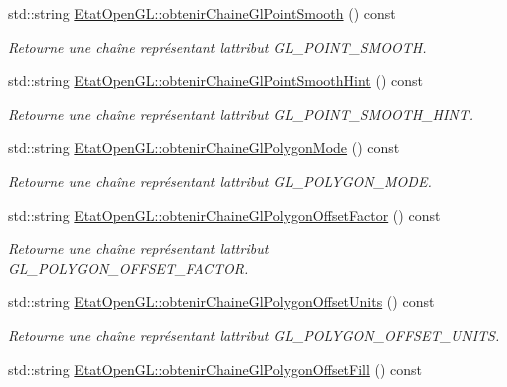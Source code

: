 \begin{DoxyCompactItemize}
std\+::string \hyperlink{group__utilitaire_ga32e178d5d54d00dc20f27cf516943a65}{Etat\+Open\+G\+L\+::obtenir\+Chaine\+Gl\+Point\+Smooth} () const 
\begin{DoxyCompactList}\small\item\em Retourne une chaîne représentant l\textquotesingle{}attribut G\+L\+\_\+\+P\+O\+I\+N\+T\+\_\+\+S\+M\+O\+O\+T\+H. \end{DoxyCompactList}\item 
std\+::string \hyperlink{group__utilitaire_gaa9c02409795d34b851b6da29f7f91c35}{Etat\+Open\+G\+L\+::obtenir\+Chaine\+Gl\+Point\+Smooth\+Hint} () const 
\begin{DoxyCompactList}\small\item\em Retourne une chaîne représentant l\textquotesingle{}attribut G\+L\+\_\+\+P\+O\+I\+N\+T\+\_\+\+S\+M\+O\+O\+T\+H\+\_\+\+H\+I\+N\+T. \end{DoxyCompactList}\item 
std\+::string \hyperlink{group__utilitaire_ga799784d6a719eb2c25ffd5854ec09aa8}{Etat\+Open\+G\+L\+::obtenir\+Chaine\+Gl\+Polygon\+Mode} () const 
\begin{DoxyCompactList}\small\item\em Retourne une chaîne représentant l\textquotesingle{}attribut G\+L\+\_\+\+P\+O\+L\+Y\+G\+O\+N\+\_\+\+M\+O\+D\+E. \end{DoxyCompactList}\item 
std\+::string \hyperlink{group__utilitaire_gaedc33f5a28be70057bb4b6124b67955a}{Etat\+Open\+G\+L\+::obtenir\+Chaine\+Gl\+Polygon\+Offset\+Factor} () const 
\begin{DoxyCompactList}\small\item\em Retourne une chaîne représentant l\textquotesingle{}attribut G\+L\+\_\+\+P\+O\+L\+Y\+G\+O\+N\+\_\+\+O\+F\+F\+S\+E\+T\+\_\+\+F\+A\+C\+T\+O\+R. \end{DoxyCompactList}\item 
std\+::string \hyperlink{group__utilitaire_ga5e5f7eacf5333293ba0f1a02bbe3cdc5}{Etat\+Open\+G\+L\+::obtenir\+Chaine\+Gl\+Polygon\+Offset\+Units} () const 
\begin{DoxyCompactList}\small\item\em Retourne une chaîne représentant l\textquotesingle{}attribut G\+L\+\_\+\+P\+O\+L\+Y\+G\+O\+N\+\_\+\+O\+F\+F\+S\+E\+T\+\_\+\+U\+N\+I\+T\+S. \end{DoxyCompactList}\item 
std\+::string \hyperlink{group__utilitaire_gaa4f958b650aeedc92140b1406f98d985}{Etat\+Open\+G\+L\+::obtenir\+Chaine\+Gl\+Polygon\+Offset\+Fill} () const 

\end{DoxyCompactItemize}
